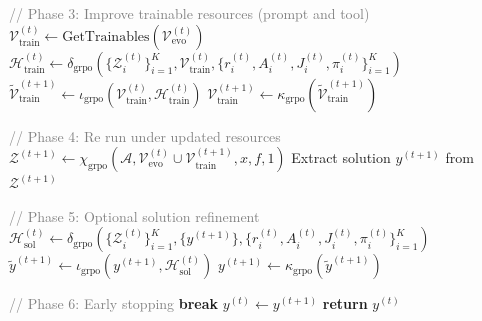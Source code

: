\begin{algorithm}[t]
\begin{algorithmic}[1]
      \vspace{0.1em}
      \STATE \textcolor{gray}{// Phase 3: Improve trainable resources (prompt and tool)}
      \STATE $\mathcal{V}_{\text{train}}^{(t)} \leftarrow \text{GetTrainables}(\mathcal{V}_{\text{evo}}^{(t)})$
      \STATE $\mathcal{H}_{\text{train}}^{(t)} \leftarrow \delta_{\mathrm{grpo}}(\{\mathcal{Z}_i^{(t)}\}_{i=1}^K, \mathcal{V}_{\text{train}}^{(t)}, \{r_i^{(t)}, A_i^{(t)}, J_i^{(t)}, \pi_i^{(t)}\}_{i=1}^K)$ 
      \STATE $\widetilde{\mathcal{V}}_{\text{train}}^{(t+1)} \leftarrow \iota_{\mathrm{grpo}}(\mathcal{V}_{\text{train}}^{(t)}, \mathcal{H}_{\text{train}}^{(t)})$ 
      \STATE $\mathcal{V}_{\text{train}}^{(t+1)} \leftarrow \kappa_{\mathrm{grpo}}(\widetilde{\mathcal{V}}_{\text{train}}^{(t+1)})$ 

      \vspace{0.1em}
      \STATE \textcolor{gray}{// Phase 4: Re run under updated resources}
      \STATE $\mathcal{Z}^{(t+1)} \leftarrow \chi_{\mathrm{grpo}}(\mathcal{A}, \mathcal{V}_{\text{evo}}^{(t)} \cup \mathcal{V}_{\text{train}}^{(t+1)}, x, f, 1)$
      \STATE Extract solution $y^{(t+1)}$ from $\mathcal{Z}^{(t+1)}$

      \vspace{0.1em}
      \STATE \textcolor{gray}{// Phase 5: Optional solution refinement}
      \STATE $\mathcal{H}_{\text{sol}}^{(t)} \leftarrow \delta_{\mathrm{grpo}}(\{\mathcal{Z}_i^{(t)}\}_{i=1}^K, \{y^{(t+1)}\}, \{r_i^{(t)}, A_i^{(t)}, J_i^{(t)}, \pi_i^{(t)}\}_{i=1}^K)$ 
      \STATE $\widetilde{y}^{(t+1)} \leftarrow \iota_{\mathrm{grpo}}(y^{(t+1)}, \mathcal{H}_{\text{sol}}^{(t)})$ 
      \STATE $y^{(t+1)} \leftarrow \kappa_{\mathrm{grpo}}(\widetilde{y}^{(t+1)})$ 
      
      \vspace{0.1em}
      \STATE \textcolor{gray}{// Phase 6: Early stopping}
          \STATE \textbf{break}
      \ENDIF
      \STATE $y^{(t)} \leftarrow y^{(t+1)}$ 
  \ENDFOR
  \STATE \textbf{return} $y^{(t)}$
  \end{algorithmic}
  \end{algorithm}
